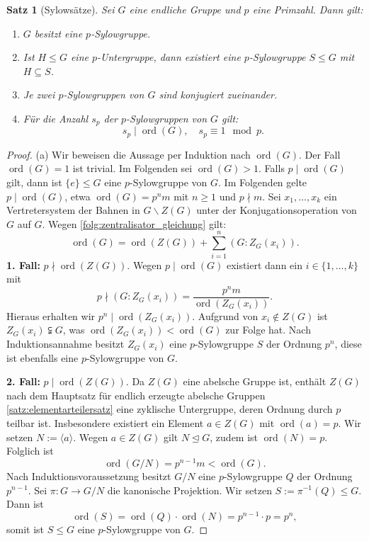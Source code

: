 \documentclass[a4paper, twoside, 11pt, ngerman]{report}
\renewcommand{\setminus}{\smallsetminus}
\DeclareMathOperator{\ord}{ord}
\theoremstyle{definistyle}
\newtheorem{satz}{Satz}[section]
\theoremstyle{remark}
\begin{document}
\begin{satz}[Sylowsätze]\label{satz:sylow}
Sei $G$ eine endliche Gruppe und $p$ eine Primzahl. Dann gilt:
\begin{enumerate}
\item[(a)] $G$ besitzt eine $p$-Sylowgruppe.
\item[(b)] Ist $H \leq G$ eine $p$-Untergruppe, dann existiert eine $p$-Sylowgruppe $S \leq G$ mit $H \subseteq S$.
\item[(c)] Je zwei $p$-Sylowgruppen von $G$ sind konjugiert zueinander.
\item[(d)] Für die Anzahl $s_p$ der $p$-Sylowgruppen von $G$ gilt:
\[
s_p\mid \ord(G), \quad s_p\equiv 1\mod p.    
\]
\end{enumerate}
\end{satz}
\begin{proof}
(a) Wir beweisen die Aussage per Induktion nach $\ord(G)$.
Der Fall $\ord(G) = 1$ ist trivial. Im Folgenden sei $\ord(G) > 1$. Falls $p \mid \ord(G)$ gilt, dann ist $\{e\} \leq G$ eine $p$-Sylowgruppe von $G$. Im Folgenden gelte $p \mid \ord(G)$, etwa $\ord(G) = p^n m$ mit $n \geq 1$ und $p \nmid m$.
Sei $x_1, \dots, x_k$ ein Vertretersystem der Bahnen in $G \setminus Z(G)$ unter der Konjugationsoperation von $G$ auf $G$. Wegen \ref{folg:zentralisator_gleichung} gilt:
\[
\ord(G) = \ord(Z(G)) + \sum_{i=1}^n (G : Z_G(x_i)).
\]
\textbf{1. Fall:} $p \nmid \ord(Z(G))$. Wegen $p\mid\ord(G)$ existiert dann ein $i \in \{1, \dots, k\}$ mit
\[
p\nmid (G : Z_{G}(x_i)) = \frac{p^n m}{\ord(Z_{G}(x_i))}.
\]
Hieraus erhalten wir $p^n \mid \ord(Z_{G}(x_i))$. Aufgrund von $x_i \notin Z(G)$ ist $Z_{G}(x_i) \subsetneqq G$, was $\ord(Z_{G}(x_i)) < \ord(G)$ zur Folge hat. Nach Induktionsannahme besitzt $Z_{G}(x_i)$ eine $p$-Sylowgruppe $S$ der Ordnung $p^n$, diese ist ebenfalls eine $p$-Sylowgruppe von $G$.

\textbf{2. Fall:} $p \mid \ord(Z(G))$. Da $Z(G)$ eine abelsche Gruppe ist, enthält $Z(G)$ nach dem Hauptsatz für endlich erzeugte abelsche Gruppen \ref{satz:elementarteilersatz} eine zyklische Untergruppe, deren Ordnung durch $p$ teilbar ist. 
Insbesondere existiert ein Element $a \in Z(G)$ mit $\ord(a) = p$. Wir setzen $N := \langle a \rangle$. Wegen $a\in Z(G)$ gilt $N \trianglelefteq G$, zudem ist $\ord(N) = p$. Folglich ist
\[
\ord(G / N) = p^{n-1} m < \ord(G).
\]
Nach Induktionsvoraussetzung besitzt $G / N$ eine $p$-Sylowgruppe $Q$ der Ordnung $p^{n-1}$. Sei $\pi \colon G \to G / N$ die kanonische Projektion. Wir setzen $S := \pi^{-1}(Q) \leq G$. Dann ist
\[
\ord(S) = \ord(Q) \cdot \ord(N) = p^{n-1} \cdot p = p^n,
\]
somit ist $S \leq G$ eine $p$-Sylowgruppe von $G$.


\end{proof}
\end{document}

